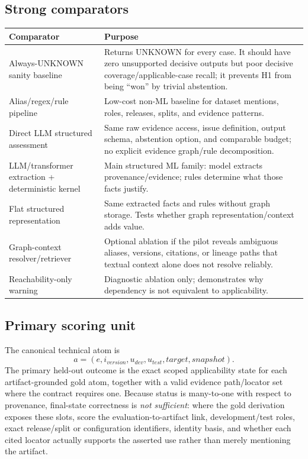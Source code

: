 \documentclass[11pt,a4paper]{article}
\newcommand{\status}[1]{\textsf{\small #1}}
\begin{document}
\subsection{Strong comparators}
\begin{tabularx}{\linewidth}{@{}L{41mm}Y@{}}
\toprule
\textbf{Comparator} & \textbf{Purpose}\\ \midrule
Always-UNKNOWN sanity baseline & Returns \status{UNKNOWN} for every case. It should have zero unsupported decisive outputs but poor decisive coverage/applicable-case recall; it prevents H1 from being ``won'' by trivial abstention.\\
Alias/regex/rule pipeline & Low-cost non-ML baseline for dataset mentions, roles, releases, splits, and evidence patterns.\\
Direct LLM structured assessment & Same raw evidence access, issue definition, output schema, abstention option, and comparable budget; no explicit evidence graph/rule decomposition.\\
LLM/transformer extraction + deterministic kernel & Main structured ML family: model extracts provenance/evidence; rules determine what those facts justify.\\
Flat structured representation & Same extracted facts and rules without graph storage. Tests whether graph representation/context adds value.\\
Graph-context resolver/retriever & Optional ablation if the pilot reveals ambiguous aliases, versions, citations, or lineage paths that textual context alone does not resolve reliably.\\
Reachability-only warning & Diagnostic ablation only; demonstrates why dependency is not equivalent to applicability.\\
\bottomrule
\end{tabularx}

\subsection{Primary scoring unit}
The canonical technical atom is
\[
a=(e,i_{version},u_{dev},u_{test},target,snapshot).
\]
The primary held-out outcome is the exact scoped applicability state for each artifact-grounded gold atom, together with a valid evidence path/locator set where the contract requires one. Because status is many-to-one with respect to provenance, final-state correctness is \emph{not sufficient}: where the gold derivation exposes these slots, score the evaluation-to-artifact link, development/test roles, exact release/split or configuration identifiers, identity basis, and whether each cited locator actually supports the asserted use rather than merely mentioning the artifact.
\end{document}
